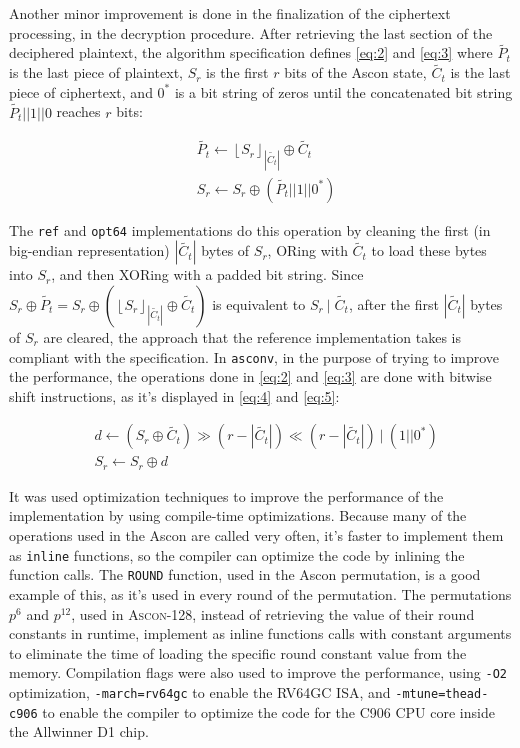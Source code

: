 \documentclass[11pt,twoside]{article}
\begin{document}
Another minor improvement is done in the finalization of the ciphertext processing, in the decryption procedure. After retrieving the last section of the deciphered plaintext, the algorithm specification defines \cref{eq:2} and \cref{eq:3} where  $\tilde{P_t}$ is the last piece of plaintext, $S_r$ is the first $r$ bits of the Ascon state, $\tilde{C_t}$ is the last piece of ciphertext, and $0^*$ is a bit string of zeros until the concatenated bit string $\tilde{P_t}||1||0$ reaches $r$ bits:

\begin{align}
   & \tilde{P_{t}} \leftarrow  {\left \lfloor S_{r}  \right \rfloor}_{\left| \tilde{C_{t}} \right|} \oplus \tilde{C_{t}} \label{eq:2} \\
   & S_r \leftarrow S_r \oplus (\tilde{P_{t}} || 1 || 0^{*}) \label{eq:3}
\end{align}

The \texttt{ref} and \texttt{opt64} implementations do this operation by cleaning the first (in big-endian representation) $| \tilde{C_{t}} |$ bytes of $S_r$, ORing with $\tilde{C_t}$ to load these bytes into $S_r$, and then XORing with a padded bit string. Since $S_r \oplus \tilde{P_t} = S_r \oplus  ({\left \lfloor S_{r}  \right \rfloor}_{\left| \tilde{C_{t}} \right|} \oplus \tilde{C_{t}})$ is equivalent to $S_{r} \ | \; \tilde{C_t}$, after the first $| \tilde{C_{t}} |$ bytes of $S_r$ are cleared, the approach that the reference implementation takes is compliant with the specification. In \texttt{asconv}, in the purpose of trying to improve the performance, the operations done in \cref{eq:2} and \cref{eq:3} are done with bitwise shift instructions, as it's displayed in \cref{eq:4} and \cref{eq:5}:

\begin{align}
   & d \leftarrow (S_r \oplus \tilde{C_{t}}) \gg (r - | \tilde{C_{t}}|) \ll (r - | \tilde{C_{t}} |) \ | \ (1||0^*) \label{eq:4} \\
   & S_r \leftarrow S_r \oplus d \label{eq:5}
\end{align}

It was used optimization techniques to improve the performance of the implementation by using compile-time optimizations. Because many of the operations used in the Ascon are called very often, it's faster to implement them as \texttt{inline} functions, so the compiler can optimize the code by inlining the function calls. The \texttt{ROUND} function, used in the Ascon permutation, is a good example of this, as it's used in every round of the permutation. The permutations $p^6$ and $p^{12}$, used in \textsc{Ascon-128}, instead of retrieving the value of their round constants in runtime, implement as inline functions calls with constant arguments to eliminate the time of loading the specific round constant value from the memory. Compilation flags were also used to improve the performance, using \texttt{-O2} optimization, \texttt{-march=rv64gc} to enable the RV64GC ISA, and \texttt{-mtune=thead-c906} to enable the compiler to optimize the code for the C906 CPU core inside the Allwinner D1 chip.
\end{document}
